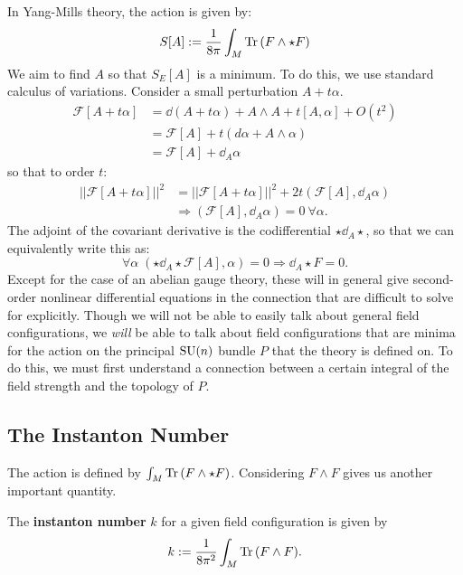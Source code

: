 In Yang-Mills theory, the action is given by:
\begin{equation}
	S[A] := \frac{1}{8\pi} \int_M \mathrm{Tr}\,(F \wedge \star F)
\end{equation}
We aim to find $A$ so that $S_E[A]$ is a minimum. To do this, we use standard calculus of variations. Consider a small perturbation $A + t \alpha$.
		\begin{equation*}
			\begin{aligned}
				\mathcal F[A + t \alpha] &= \dd (A + t \alpha) + A \wedge A + t [A, \alpha] + O(t^2) \\
				&= \mathcal F[A] + t (d \alpha + A \wedge \alpha)\\
				&= \mathcal F[A] + \dd_{A} \alpha
			\end{aligned}
		\end{equation*}
		so that to order $t$:
		\begin{equation*}
			\begin{aligned}
				||\mathcal F[A + t \alpha]||^2 &= ||\mathcal F[A + t \alpha]||^2 + 2 t (\mathcal F[A], \dd_{A} \alpha)\\
				&\Rightarrow (\mathcal F[A], \dd_{A} \alpha) = 0 ~ \forall \alpha.
			\end{aligned}
		\end{equation*}
		The adjoint of the covariant derivative is the codifferential $\star \dd_A \star$, so that we can equivalently write this as:
		\[
			\forall \alpha \; (\star \dd_A \star \mathcal F[A], \alpha) = 0 \Rightarrow \dd_A \star F = 0.
		\]
		Except for the case of an abelian gauge theory, these will in general give second-order nonlinear differential equations in the connection that are difficult to solve for explicitly. Though we will not be able to easily talk about general field configurations, we \emph{will} be able to talk about field configurations that are minima for the action on the principal $\mathrm{SU}(n)$ bundle $P$ that the theory is defined on. To do this, we must first understand a connection between a certain integral of the field strength and the topology of $P$.


\subsection{The Instanton Number} %
\label{sub:the_instanton_number}

		The action is defined by $\int_M \mathrm{Tr}\,(F \wedge \star F)$. Considering $F \wedge F$ gives us another important quantity. 
		\begin{defn}
			The \textbf{instanton number} $k$ for a given field configuration is given by
			\begin{equation}
				k := \frac{1}{8\pi^2} \int_M \mathrm{Tr}\,(F \wedge F).
			\end{equation}
		\end{defn}

